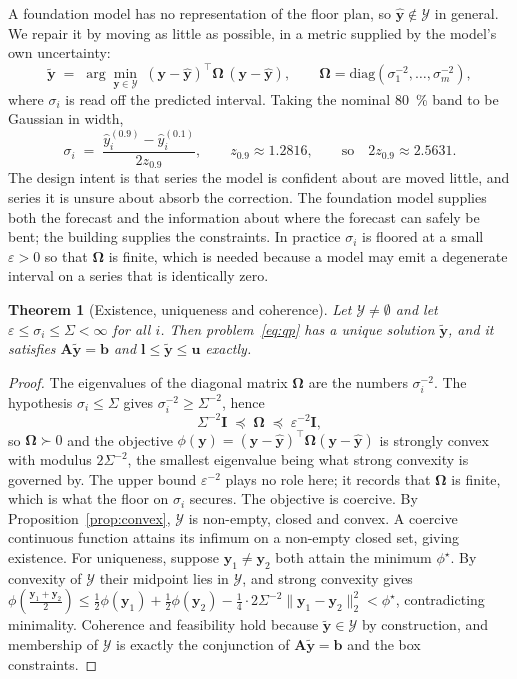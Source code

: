 \documentclass[utf8]{FrontiersinHarvard}
\newif\ifrevisionmarkup
\newcommand{\new}[1]{\ifrevisionmarkup\textcolor{revision}{#1}\else#1\fi}
\theoremstyle{plain}
\newtheorem{theorem}{Theorem}
\theoremstyle{definition}
\theoremstyle{remark}
\newcommand{\bA}{\bm{A}}
\newcommand{\by}{\bm{y}}
\newcommand{\bb}{\bm{b}}
\newcommand{\bOm}{\bm{\Omega}}
\newcommand{\yhat}{\hat{\by}}
\newcommand{\ytil}{\tilde{\by}}
\newcommand{\cY}{\mathcal{Y}}
\begin{document}
A foundation model has no representation of the floor plan, so $\yhat \notin \cY$ in general. We repair it by moving as little as possible, in a metric supplied by the model's own uncertainty:
\begin{equation}
\ytil \;=\; \arg\min_{\by \in \cY} \; (\by - \yhat)^{\top} \bOm \, (\by - \yhat),
\qquad
\bOm = \mathrm{diag}\!\left(\sigma_1^{-2},\dots,\sigma_m^{-2}\right),
\label{eq:qp}
\end{equation}
where $\sigma_i$ is read off the predicted interval. Taking the nominal \SI{80}{\percent} band to be Gaussian in width,
\begin{equation}
\sigma_i \;=\; \frac{\hat{y}^{(0.9)}_i - \hat{y}^{(0.1)}_i}{2 z_{0.9}},
\qquad z_{0.9} \approx 1.2816,
\qquad \text{so} \quad 2 z_{0.9} \approx 2.5631 .
\label{eq:sigma}
\end{equation}
The design intent is that series the model is confident about are moved little, and series it is unsure about absorb the correction. The foundation model supplies both the forecast and the information about where the forecast can safely be bent; the building supplies the constraints. In practice $\sigma_i$ is floored at a small $\varepsilon>0$ so that $\bOm$ is finite, which is needed because a model may emit a degenerate interval on a series that is identically zero.

\begin{theorem}[Existence, uniqueness and coherence]
\label{thm:unique}
Let $\cY \ne \emptyset$ and let \new{$\varepsilon \le \sigma_i \le \Sigma < \infty$} for all $i$. Then problem~\eqref{eq:qp} has a unique solution $\ytil$, and it satisfies $\bA\ytil = \bb$ and $\bm{l}\le\ytil\le\bm{u}$ exactly.
\end{theorem}
\begin{proof}
\new{The eigenvalues of the diagonal matrix $\bOm$ are the numbers $\sigma_i^{-2}$. The hypothesis $\sigma_i \le \Sigma$ gives $\sigma_i^{-2} \ge \Sigma^{-2}$, hence}
\new{\begin{equation}
\Sigma^{-2}\bm{I} \;\preceq\; \bOm \;\preceq\; \varepsilon^{-2}\bm{I},
\label{eq:omegabound}
\end{equation}}
\new{so $\bOm \succ 0$ and the objective $\phi(\by) = (\by-\yhat)^{\top}\bOm(\by-\yhat)$ is strongly convex with modulus $2\Sigma^{-2}$, the smallest eigenvalue being what strong convexity is governed by. The upper bound $\varepsilon^{-2}$ plays no role here; it records that $\bOm$ is finite, which is what the floor on $\sigma_i$ secures.} The objective is coercive. By Proposition~\ref{prop:convex}, $\cY$ is non-empty, closed and convex. A coercive continuous function attains its infimum on a non-empty closed set, giving existence. For uniqueness, suppose $\by_1 \ne \by_2$ both attain the minimum $\phi^\star$. By convexity of $\cY$ their midpoint lies in $\cY$, and strong convexity gives
$\phi\!\left(\tfrac{\by_1+\by_2}{2}\right) \le \tfrac{1}{2}\phi(\by_1) + \tfrac{1}{2}\phi(\by_2) - \tfrac{1}{4}\cdot 2\new{\Sigma^{-2}}\|\by_1-\by_2\|_2^2 < \phi^\star$,
contradicting minimality. Coherence and feasibility hold because $\ytil \in \cY$ by construction, and membership of $\cY$ is exactly the conjunction of $\bA\ytil=\bb$ and the box constraints.
\end{proof}
\end{document}
